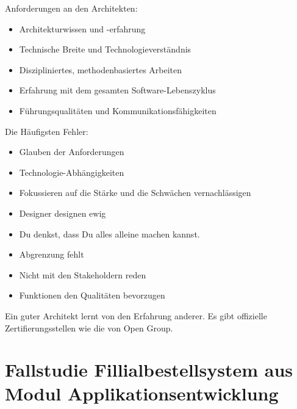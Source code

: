 Anforderungen an den Architekten:

\begin{itemize}
	\item Architekturwissen und -erfahrung
	\item Technische Breite und Technologieverständnis
	\item Diszipliniertes, methodenbasiertes Arbeiten
	\item Erfahrung mit dem gesamten Software-Lebenszyklus
	\item Führungsqualitäten und Kommunikationsfähigkeiten
\end{itemize}

Die Häufigsten Fehler:
\begin{itemize}
	\item Glauben der Anforderungen
	\item Technologie-Abhängigkeiten
	\item Fokussieren auf die Stärke und die Schwächen vernachlässigen
	\item Designer designen ewig
	\item Du denkst, dass Du alles alleine machen kannst.
	\item Abgrenzung fehlt
	\item Nicht mit den Stakeholdern reden
	\item Funktionen den Qualitäten bevorzugen
\end{itemize}

Ein guter Architekt lernt von den Erfahrung anderer. Es gibt offizielle Zertifierungsstellen wie die von Open Group.


\section{Fallstudie Fillialbestellsystem aus Modul Applikationsentwicklung}
